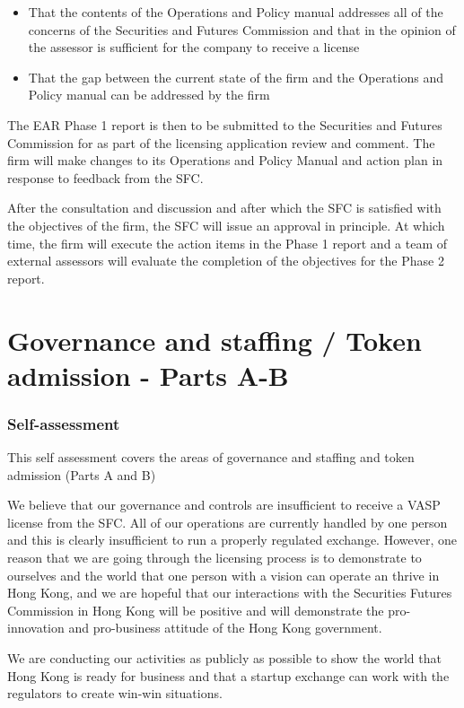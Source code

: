 \documentclass[]{report}
\begin{document}
\begin{itemize}
  \item That the contents of the Operations and Policy manual
    addresses all of the concerns of the Securities and Futures
    Commission and that in the opinion of the assessor is sufficient
    for the company to receive a license
  \item That the gap between the current state of the firm and the
    Operations and Policy manual can be addressed by the firm
\end{itemize}

The EAR Phase 1 report is then to be submitted to the Securities and
Futures Commission for as part of the licensing application review and
comment.  The firm will make changes to its Operations and Policy
Manual and action plan in response to feedback from the SFC.

After the consultation and discussion and after which the SFC is
satisfied with the objectives of the firm, the SFC will issue an
approval in principle.  At which time, the firm will execute the
action items in the Phase 1 report and a team of external assessors
will evaluate the completion of the objectives for the Phase 2 report.

\chapter{Governance and staffing / Token admission - Parts A-B}
\subsection{Self-assessment}
This self assessment covers the areas of governance and staffing and
token admission (Parts A and B)

We believe that our governance and controls are insufficient
to receive a VASP license from the SFC.  All of our operations are
currently handled by one person and this is clearly insufficient to
run a properly regulated exchange.  However, one reason that we are
going through the licensing process is to demonstrate to ourselves and
the world that one person with a vision can operate an thrive in Hong
Kong, and we are hopeful that our interactions with the Securities
Futures Commission in Hong Kong will be positive and will demonstrate
the pro-innovation and pro-business attitude of the Hong Kong
government.

We are conducting our activities as publicly as possible to show the
world that Hong Kong is ready for business and that a startup exchange
can work with the regulators to create win-win situations.
\end{document}
